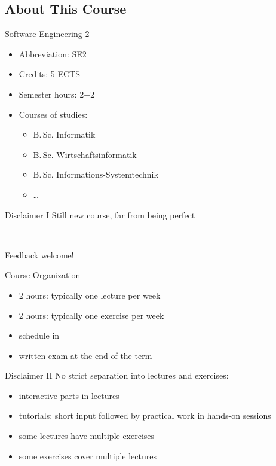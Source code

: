 \subsection{About This Course} 
\begin{frame}{\insertsubsection}
	\begin{fancycolumns}
		\begin{definition}{Software Engineering 2}
			\begin{itemize}
				\item Abbreviation: SE2
				\item Credits: 5 ECTS
				\item Semester hours: 2+2
				\item Courses of studies:
				\begin{itemize}
					\item B.\,Sc.{} Informatik
					\item B.\,Sc.{} Wirtschaftsinformatik
					\item B.\,Sc.{} Informations-Systemtechnik
					\item \ldots
				\end{itemize}
			\end{itemize}
		\end{definition}
		\begin{note}{Disclaimer I}
			Still new course, far from being perfect
			
			~
			
			Feedback welcome!
		\end{note}
		\nextcolumn
		\begin{definition}{Course Organization}
			\begin{itemize}
				\item 2 hours: typically one lecture per week
				\item 2 hours: typically one exercise per week
				\item schedule in \StudIP
				\item written exam at the end of the term
			\end{itemize}
		\end{definition}
		\begin{note}{Disclaimer II}
			No strict separation into lectures and exercises:
			\begin{itemize}
				\item interactive parts in lectures
				\item tutorials: short input followed by practical work in hands-on sessions
				\item some lectures have multiple exercises
				\item some exercises cover multiple lectures
			\end{itemize}
		\end{note}
	\end{fancycolumns}
\end{frame}


